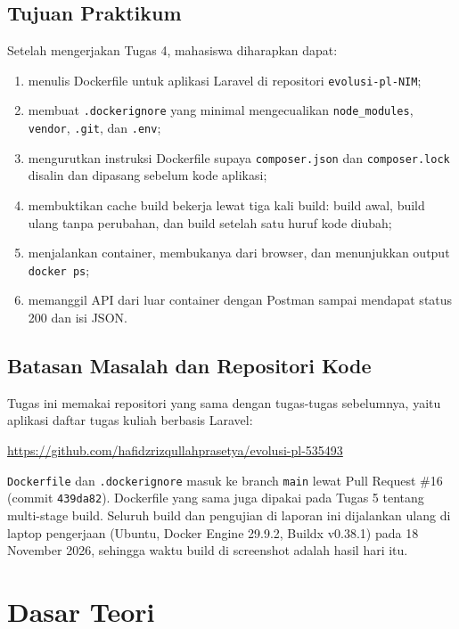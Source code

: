 \documentclass[a4paper,oneside,12pt]{report}
\begin{document}
\section{Tujuan Praktikum}
Setelah mengerjakan Tugas 4, mahasiswa diharapkan dapat:
\begin{enumerate}
    \item menulis Dockerfile untuk aplikasi Laravel di repositori \texttt{evolusi-pl-NIM};
    \item membuat \texttt{.dockerignore} yang minimal mengecualikan \texttt{node\_modules}, \texttt{vendor}, \texttt{.git}, dan \texttt{.env};
    \item mengurutkan instruksi Dockerfile supaya \texttt{composer.json} dan \texttt{composer.lock} disalin dan dipasang sebelum kode aplikasi;
    \item membuktikan cache build bekerja lewat tiga kali build: build awal, build ulang tanpa perubahan, dan build setelah satu huruf kode diubah;
    \item menjalankan container, membukanya dari browser, dan menunjukkan output \texttt{docker ps};
    \item memanggil API dari luar container dengan Postman sampai mendapat status 200 dan isi JSON.
\end{enumerate}

\section{Batasan Masalah dan Repositori Kode}
Tugas ini memakai repositori yang sama dengan tugas-tugas sebelumnya, yaitu aplikasi daftar tugas kuliah berbasis Laravel:
\begin{center}
    \url{https://github.com/hafidzrizqullahprasetya/evolusi-pl-535493}
\end{center}
\texttt{Dockerfile} dan \texttt{.dockerignore} masuk ke branch \texttt{main} lewat Pull Request \#16 (commit \texttt{439da82}). Dockerfile yang sama juga dipakai pada Tugas 5 tentang multi-stage build. Seluruh build dan pengujian di laporan ini dijalankan ulang di laptop pengerjaan (Ubuntu, Docker Engine 29.9.2, Buildx v0.38.1) pada 18 November 2026, sehingga waktu build di screenshot adalah hasil hari itu.

\clearpage

\chapter{Dasar Teori}
\end{document}
